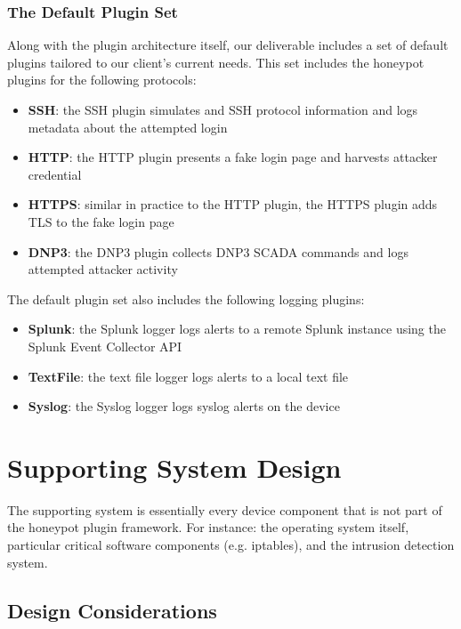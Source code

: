\subsubsection{The Default Plugin Set}

Along with the plugin architecture itself, our deliverable includes a set
of default plugins tailored to our client's current needs. This set includes
the honeypot plugins for the following protocols:
\begin{itemize}
    \item \textbf{SSH}: the SSH plugin simulates and SSH protocol information and
    logs metadata about the attempted login
    \item \textbf{HTTP}: the HTTP plugin presents a fake login page and harvests
    attacker credential
    \item \textbf{HTTPS}: similar in practice to the HTTP plugin, the HTTPS plugin
    adds TLS to the fake login page
    \item \textbf{DNP3}: the DNP3 plugin collects DNP3 SCADA commands and logs
    attempted attacker activity
\end{itemize}

The default plugin set also includes the following logging plugins:
\begin{itemize}
    \item \textbf{Splunk}: the Splunk logger logs alerts to a remote Splunk
    instance using the Splunk Event Collector API
    \item \textbf{TextFile}: the text file logger logs alerts to a local text
    file
    \item \textbf{Syslog}: the Syslog logger logs syslog alerts on the device
\end{itemize}


\section{Supporting System Design}

The supporting system is essentially every device component that is not part of
the honeypot plugin framework. For instance: the operating system itself,
particular critical software components (e.g. iptables), and the intrusion
detection system.

\subsection{Design Considerations}

